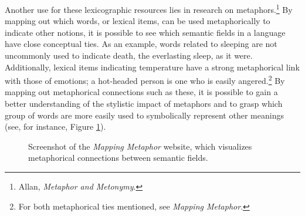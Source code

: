 Another use for these lexicographic resources lies in research on metaphors.\footnote{Allan, \textit{Metaphor and Metonymy}.} By mapping out which words, or lexical items, can be used metaphorically to indicate other notions, it is possible to see which semantic fields in a language have close conceptual ties. As an example, words related to sleeping are not uncommonly used to indicate death, the everlasting sleep, as it were. Additionally, lexical items indicating temperature have a strong metaphorical link with those of emotions; a hot-headed person is one who is easily angered.\footnote{For both metaphorical ties mentioned, see \textit{Mapping Metaphor}.} By mapping out metaphorical connections such as these, it is possible to gain a better understanding of the stylistic impact of metaphors and to grasp which group of words are more easily used to symbolically represent other meanings (see, for instance, Figure \ref{fig:Introduction:MM}). 
\begin{figure}[htb!]
	\caption[]{\label{fig:Introduction:MM} Screenshot of the \textit{Mapping Metaphor} website, which visualizes metaphorical connections between semantic fields.}
\end{figure}



